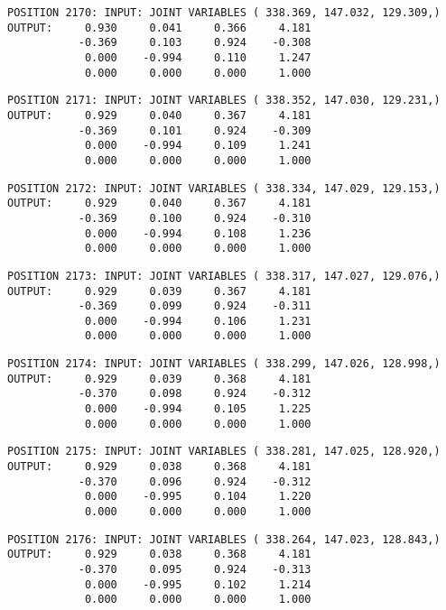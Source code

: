 \begin{verbatim}
POSITION 2170: INPUT: JOINT VARIABLES ( 338.369, 147.032, 129.309,)
OUTPUT:     0.930     0.041     0.366     4.181
           -0.369     0.103     0.924    -0.308
            0.000    -0.994     0.110     1.247
            0.000     0.000     0.000     1.000
\end{verbatim} \pagebreak[1]\begin{verbatim}
POSITION 2171: INPUT: JOINT VARIABLES ( 338.352, 147.030, 129.231,)
OUTPUT:     0.929     0.040     0.367     4.181
           -0.369     0.101     0.924    -0.309
            0.000    -0.994     0.109     1.241
            0.000     0.000     0.000     1.000
\end{verbatim} \pagebreak[1]\begin{verbatim}
POSITION 2172: INPUT: JOINT VARIABLES ( 338.334, 147.029, 129.153,)
OUTPUT:     0.929     0.040     0.367     4.181
           -0.369     0.100     0.924    -0.310
            0.000    -0.994     0.108     1.236
            0.000     0.000     0.000     1.000
\end{verbatim} \pagebreak[1]\begin{verbatim}
POSITION 2173: INPUT: JOINT VARIABLES ( 338.317, 147.027, 129.076,)
OUTPUT:     0.929     0.039     0.367     4.181
           -0.369     0.099     0.924    -0.311
            0.000    -0.994     0.106     1.231
            0.000     0.000     0.000     1.000
\end{verbatim} \pagebreak[1]\begin{verbatim}
POSITION 2174: INPUT: JOINT VARIABLES ( 338.299, 147.026, 128.998,)
OUTPUT:     0.929     0.039     0.368     4.181
           -0.370     0.098     0.924    -0.312
            0.000    -0.994     0.105     1.225
            0.000     0.000     0.000     1.000
\end{verbatim} \pagebreak[1]\begin{verbatim}
POSITION 2175: INPUT: JOINT VARIABLES ( 338.281, 147.025, 128.920,)
OUTPUT:     0.929     0.038     0.368     4.181
           -0.370     0.096     0.924    -0.312
            0.000    -0.995     0.104     1.220
            0.000     0.000     0.000     1.000
\end{verbatim} \pagebreak[1]\begin{verbatim}
POSITION 2176: INPUT: JOINT VARIABLES ( 338.264, 147.023, 128.843,)
OUTPUT:     0.929     0.038     0.368     4.181
           -0.370     0.095     0.924    -0.313
            0.000    -0.995     0.102     1.214
            0.000     0.000     0.000     1.000
\end{verbatim} \pagebreak[1]\begin{verbatim}

\end{verbatim}
